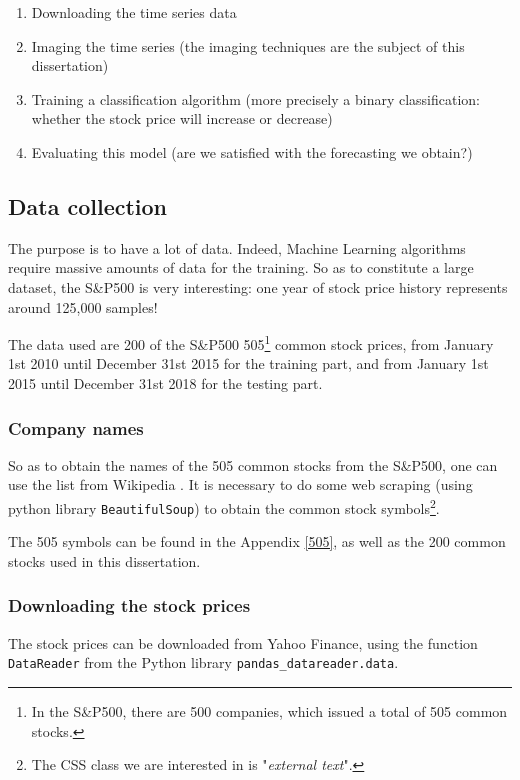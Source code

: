 \documentclass[11pt]{article}
\newcommand{\code}[1]{\colorbox{light-gray}{\texttt{#1}}}
\begin{document}
\begin{onehalfspace}
\begin{enumerate}
    \item Downloading the time series data
    \item Imaging the time series (the imaging techniques are the subject of this dissertation)
    \item Training a classification algorithm (more precisely a binary classification: whether the stock price will increase or decrease)
    \item Evaluating this model (are we satisfied with the forecasting we obtain?)
\end{enumerate}

\subsection{Data collection}

The purpose is to have a lot of data. Indeed, Machine Learning algorithms require massive amounts of data for the training. So as to constitute a large dataset, the S\&P500 is very interesting: one year of stock price history represents around 125,000 samples!

The data used are 200 of the S\&P500 505\footnote{In the S\&P500, there are 500 companies, which issued a total of 505 common stocks.} common stock prices, from January 1st 2010 until December 31st 2015 for the training part, and from January 1st 2015 until December 31st 2018 for the testing part.

\subsubsection{Company names}

So as to obtain the names of the 505 common stocks from the S\&P500, one can use the list from Wikipedia \cite{500names}. It is necessary to do some web scraping (using python library \code{BeautifulSoup}) to obtain the common stock symbols\footnote{The CSS class we are interested in is "\textit{external text}".}. 

The 505 symbols can be found in the Appendix \ref{505}, as well as the 200 common stocks used in this dissertation. 

\subsubsection{Downloading the stock prices}

The stock prices can be downloaded from Yahoo Finance, using the function \code{DataReader} from the Python library \code{pandas\_datareader.data}.


\end{onehalfspace}
\end{document}
